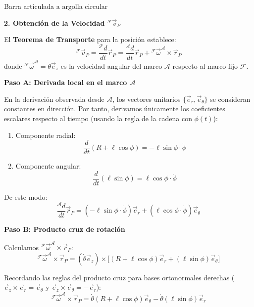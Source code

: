 \begin{solucion}{Barra articulada a argolla circular}
\vspace{0.5cm}

\noindent\textbf{2. Obtención de la Velocidad ${}^{\mathcal{F}}\vec{v}_P$}

El \textbf{Teorema de Transporte} para la posición establece:
\[
{}^{\mathcal{F}}\vec{v}_P = \frac{{}^{\mathcal{F}}d}{dt}\vec{r}_P = \frac{{}^{\mathcal{A}}d}{dt}\vec{r}_P + {}^{\mathcal{F}}\vec{\omega}^{\mathcal{A}} \times \vec{r}_P
\]
donde ${}^{\mathcal{F}}\vec{\omega}^{\mathcal{A}} = \dot{\theta}\vec{e}_z$ es la velocidad angular del marco $\mathcal{A}$ respecto al marco fijo $\mathcal{F}$.

\vspace{0.3cm}

\noindent\textbf{Paso A: Derivada local en el marco $\mathcal{A}$}

En la derivación observada desde $\mathcal{A}$, los vectores unitarios $\{\vec{e}_r, \vec{e}_\theta\}$ se consideran constantes en dirección. Por tanto, derivamos únicamente los coeficientes escalares respecto al tiempo (usando la regla de la cadena con $\phi(t)$):
\begin{enumerate}
    \item Componente radial:
    \[
    \frac{d}{dt}(R + \ell\cos\phi) = -\ell\sin\phi \cdot \dot{\phi}
    \]
    \item Componente angular:
    \[
    \frac{d}{dt}(\ell\sin\phi) = \ell\cos\phi \cdot \dot{\phi}
    \]
\end{enumerate}

De este modo:
\[
\frac{{}^{\mathcal{A}}d}{dt}\vec{r}_P = (-\ell\sin\phi \cdot \dot{\phi})\vec{e}_r + (\ell\cos\phi \cdot \dot{\phi})\vec{e}_\theta
\]

\vspace{0.3cm}

\noindent\textbf{Paso B: Producto cruz de rotación}

Calculamos ${}^{\mathcal{F}}\vec{\omega}^{\mathcal{A}} \times \vec{r}_P$:
\[
{}^{\mathcal{F}}\vec{\omega}^{\mathcal{A}} \times \vec{r}_P = (\dot{\theta}\vec{e}_z) \times \Big[ (R + \ell\cos\phi)\vec{e}_r + (\ell\sin\phi)\vec{e}_\theta \Big]
\]

Recordando las reglas del producto cruz para bases ortonormales derechas ($\vec{e}_z \times \vec{e}_r = \vec{e}_\theta$ y $\vec{e}_z \times \vec{e}_\theta = -\vec{e}_r$):
\[
{}^{\mathcal{F}}\vec{\omega}^{\mathcal{A}} \times \vec{r}_P = \dot{\theta}(R + \ell\cos\phi)\vec{e}_\theta - \dot{\theta}(\ell\sin\phi)\vec{e}_r
\]


\end{solucion}
